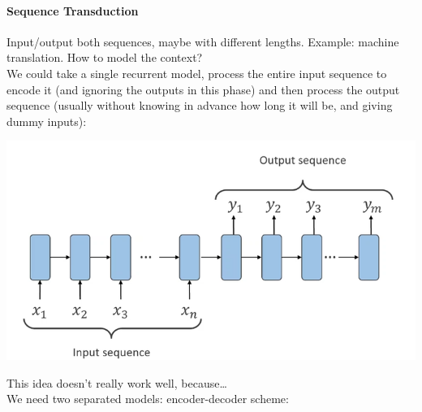 \documentclass[10pt]{report}
\begin{document}
\paragraph{Sequence Transduction} Input/output both sequences, maybe with different lengths. Example: machine translation. How to model the context?\\
We could take a single recurrent model, process the entire input sequence to encode it (and ignoring the outputs in this phase) and then process the output sequence (usually without knowing in advance how long it will be, and giving dummy inputs):
\begin{center}
	\includegraphics[scale=0.5]{107.png}
\end{center}
This idea doesn't really work well, because\ldots\\ %
We need two separated models: encoder-decoder scheme:
\end{document}
